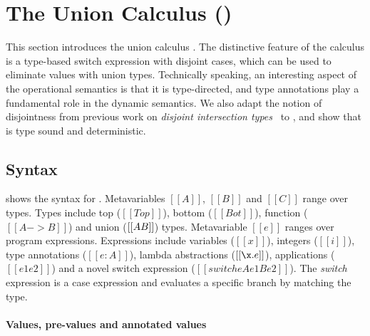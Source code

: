 \section{The Union Calculus (\name)}
\label{sec:union}

This section introduces the union calculus \name. The distinctive feature
of the \name calculus is a type-based switch expression with disjoint
cases, which can be used to eliminate values with union types.
Technically speaking, an interesting aspect of the operational
semantics is that it is type-directed,
and type annotations
play a fundamental role in the dynamic semantics.
We also adapt the notion of disjointness from previous work on
\emph{disjoint intersection types}~\cite{oliveira2016disjoint} to \name, and show that \name is type
sound and deterministic.


\subsection{Syntax}\label{sec:union:syntax}
 shows the syntax for \cal. Metavariables
$[[A]]$, $[[B]]$ and $[[C]]$ range over types.  Types include top ($[[Top]]$),
bottom ($[[Bot]]$), function ($[[A -> B]]$) and union ($[[A \/ B]]$)
types. Metavariable $[[e]]$ ranges over program
expressions. Expressions include variables ($[[x]]$), integers
($[[i]]$), type annotations ($[[e:A]]$), lambda abstractions
($[[\x.e]]$), applications ($[[e1 e2]]$) and a novel switch expression ($[[switch
    e A e1 B e2]]$). The \emph{switch} expression is a case
expression and evaluates a specific branch by matching the
type.

\paragraph{Values, pre-values and annotated values}

